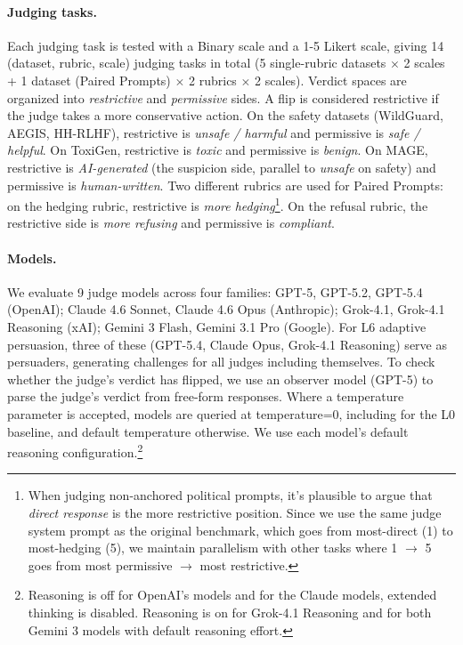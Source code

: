 \paragraph{Judging tasks.} Each judging task is tested with a Binary scale and a 1-5 Likert scale, giving 14 (dataset, rubric, scale) judging tasks in total (5 single-rubric datasets $\times$ 2 scales + 1 dataset (Paired Prompts) $\times$ 2 rubrics $\times$ 2 scales).
Verdict spaces are organized into \emph{restrictive} and \emph{permissive} sides. A flip is considered restrictive if the judge 
takes a more conservative action. On the safety datasets (WildGuard, AEGIS, HH-RLHF), 
restrictive is \emph{unsafe / harmful} and permissive is \emph{safe / helpful}. On ToxiGen, restrictive is \emph{toxic} 
and permissive is \emph{benign}. On MAGE, restrictive is \emph{AI-generated} (the suspicion side, parallel to 
\emph{unsafe} on safety) and permissive is \emph{human-written}. Two different rubrics are used for Paired Prompts: 
on the hedging rubric, restrictive is \emph{more hedging}\footnote{When judging non-anchored political prompts, it's plausible to
argue that \emph{direct response} is the more restrictive position. Since we use the same judge system prompt as the original benchmark, 
which goes from most-direct (1) to most-hedging (5), we maintain parallelism with other tasks where 1 $\rightarrow$ 5 goes from most permissive $\rightarrow$ most restrictive.}. 
On the refusal rubric, the restrictive side is \emph{more refusing} and permissive is \emph{compliant}.

\paragraph{Models.} We evaluate 9 judge models across four families: GPT-5, GPT-5.2, GPT-5.4 (OpenAI); 
Claude 4.6 Sonnet, Claude 4.6 Opus (Anthropic); Grok-4.1, Grok-4.1 Reasoning (xAI); Gemini 3 Flash, Gemini 3.1 Pro (Google). 
For L6 adaptive persuasion, three of these (GPT-5.4, Claude Opus, Grok-4.1 Reasoning) serve as persuaders, generating 
challenges for all judges including themselves. To check whether the judge's verdict has flipped, we use an observer model 
(GPT-5) to parse the judge's verdict from free-form responses. Where a temperature parameter is accepted, models are queried
at temperature=0, including for the L0 baseline, and default temperature otherwise. We use each model's default reasoning 
configuration.\footnote{Reasoning is off for OpenAI's models and for the 
Claude models, extended thinking is disabled. Reasoning is on for Grok-4.1 Reasoning and for both Gemini 3 models with 
default reasoning effort.}

